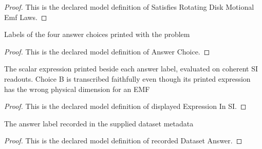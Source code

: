 \begin{proof}
  This is the declared model definition of Satisfies Rotating Disk Motional Emf Laws.
\end{proof}
\begin{definition}
  \label{def:physics:phyx-mini-0920:phyxminiproblems-problemphyxmini0920-answerchoice}
  Labels of the four answer choices printed with the problem
\end{definition}
\begin{proof}
  This is the declared model definition of Answer Choice.
\end{proof}
\begin{definition}
  \label{def:physics:phyx-mini-0920:phyxminiproblems-problemphyxmini0920-answerchoice-displayedexpressioninsi}
  The scalar expression printed beside each answer label, evaluated on coherent SI readouts. Choice B is transcribed faithfully even though its printed expression has the wrong physical dimension for an EMF
\end{definition}
\begin{proof}
  This is the declared model definition of displayed Expression In SI.
\end{proof}
\begin{definition}
  \label{def:physics:phyx-mini-0920:phyxminiproblems-problemphyxmini0920-recordeddatasetanswer}
  The answer label recorded in the supplied dataset metadata
\end{definition}
\begin{proof}
  This is the declared model definition of recorded Dataset Answer.
\end{proof}
